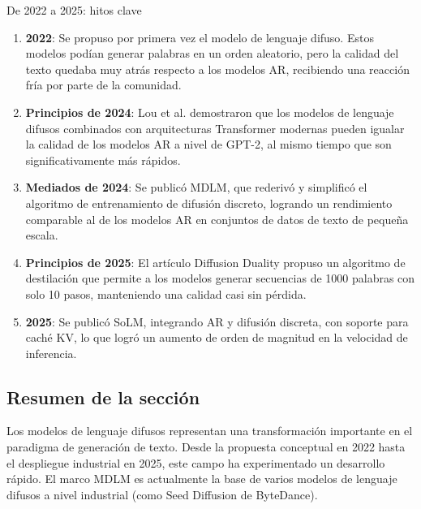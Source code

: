 \begin{knowledgebox}{De 2022 a 2025: hitos clave}
\begin{enumerate}
    \item \textbf{2022}: Se propuso por primera vez el modelo de lenguaje difuso. Estos modelos podían generar palabras en un orden aleatorio, pero la calidad del texto quedaba muy atrás respecto a los modelos AR, recibiendo una reacción fría por parte de la comunidad.
    \item \textbf{Principios de 2024}: Lou et al. demostraron que los modelos de lenguaje difusos combinados con arquitecturas Transformer modernas pueden igualar la calidad de los modelos AR a nivel de GPT-2, al mismo tiempo que son significativamente más rápidos.
    \item \textbf{Mediados de 2024}: Se publicó MDLM, que rederivó y simplificó el algoritmo de entrenamiento de difusión discreto, logrando un rendimiento comparable al de los modelos AR en conjuntos de datos de texto de pequeña escala.
    \item \textbf{Principios de 2025}: El artículo Diffusion Duality propuso un algoritmo de destilación que permite a los modelos generar secuencias de 1000 palabras con solo 10 pasos, manteniendo una calidad casi sin pérdida.
    \item \textbf{2025}: Se publicó SoLM, integrando AR y difusión discreta, con soporte para caché KV, lo que logró un aumento de orden de magnitud en la velocidad de inferencia.
\end{enumerate}
\end{knowledgebox}

\subsection{Resumen de la sección}

Los modelos de lenguaje difusos representan una transformación importante en el paradigma de generación de texto. Desde la propuesta conceptual en 2022 hasta el despliegue industrial en 2025, este campo ha experimentado un desarrollo rápido. El marco MDLM es actualmente la base de varios modelos de lenguaje difusos a nivel industrial (como Seed Diffusion de ByteDance).

\newpage
